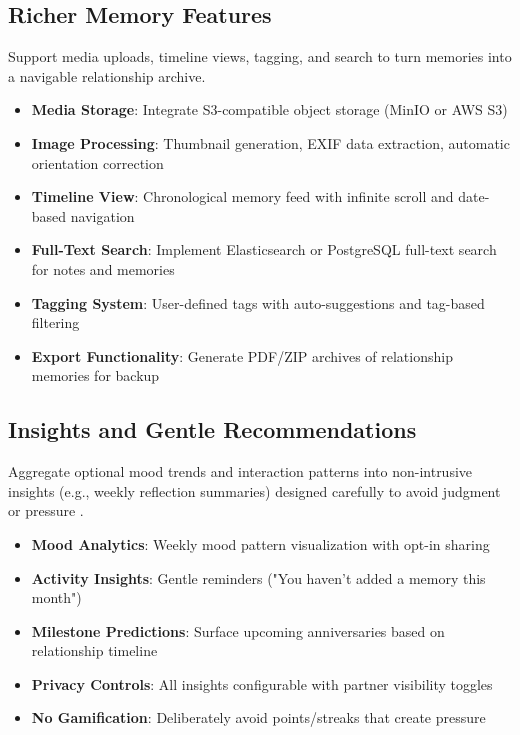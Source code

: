 \documentclass[sigconf, authorversion, nonacm, margin=0.75in]{acmart}
\begin{document}
\subsection{Richer Memory Features}
Support media uploads, timeline views, tagging, and search to turn memories into a navigable relationship archive.
\begin{itemize}
    \item \textbf{Media Storage}: Integrate S3-compatible object storage (MinIO or AWS S3)
    \item \textbf{Image Processing}: Thumbnail generation, EXIF data extraction, automatic orientation correction
    \item \textbf{Timeline View}: Chronological memory feed with infinite scroll and date-based navigation
    \item \textbf{Full-Text Search}: Implement Elasticsearch or PostgreSQL full-text search for notes and memories
    \item \textbf{Tagging System}: User-defined tags with auto-suggestions and tag-based filtering
    \item \textbf{Export Functionality}: Generate PDF/ZIP archives of relationship memories for backup
\end{itemize}

\subsection{Insights and Gentle Recommendations}
Aggregate optional mood trends and interaction patterns into non-intrusive insights (e.g., weekly reflection summaries) designed carefully to avoid judgment or pressure \cite{digital_wellbeing_survey}.
\begin{itemize}
    \item \textbf{Mood Analytics}: Weekly mood pattern visualization with opt-in sharing
    \item \textbf{Activity Insights}: Gentle reminders ("You haven't added a memory this month")
    \item \textbf{Milestone Predictions}: Surface upcoming anniversaries based on relationship timeline
    \item \textbf{Privacy Controls}: All insights configurable with partner visibility toggles
    \item \textbf{No Gamification}: Deliberately avoid points/streaks that create pressure
\end{itemize}
\end{document}

